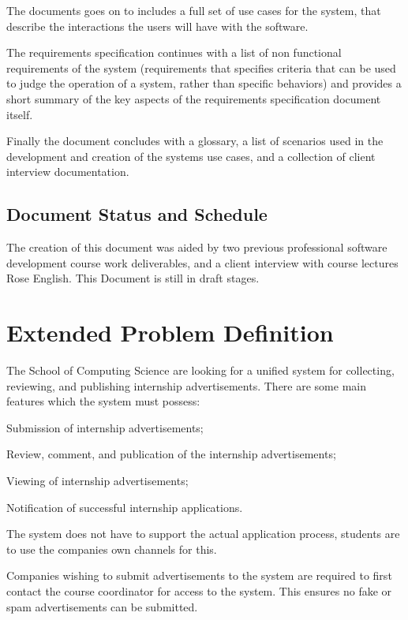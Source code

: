\documentclass{l3deliverable}
\begin{document}
The documents goes on to includes a full set of use cases for the system, that describe the interactions the users will have with the software. 

The requirements specification continues with a list of non functional requirements of the system (requirements that specifies criteria that can be used to judge the operation of a system, rather than specific behaviors) and  provides a short summary of the key aspects of the requirements specification document itself.

Finally the document concludes with a glossary, a list of scenarios used in the development and creation of the systems use cases, and a collection of client interview documentation. 


\subsection{Document Status and Schedule}

The creation of this document was aided by two previous professional software development course work deliverables, and a client interview with course lectures Rose English. This Document is still in draft stages.





\section{Extended Problem Definition}


The School of Computing Science are looking for a unified system for 
collecting, reviewing, and publishing internship advertisements. There are 
some main features which the system must possess: 

Submission of internship advertisements;

Review, comment, and publication of the internship advertisements;

Viewing of internship advertisements;

Notification of successful internship applications.

The system does not have to support the actual application process, students
are to use the companies own channels for this.

Companies wishing to submit advertisements to the system are required to first
contact the course coordinator for access to the system. This ensures no fake
or spam advertisements can be submitted.
\end{document}
